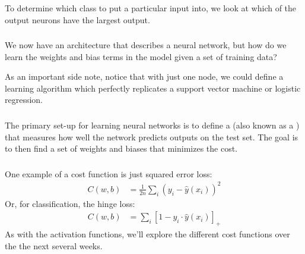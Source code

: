 \documentclass[xetex,mathserif,serif,aspectratio=169]{beamer}
\begin{document}
\begin{frame}[fragile] \frametitle{} \oldB \small


To determine which class to put a particular input into, we
look at which of the output neurons have the largest output.

\end{frame}

\begin{frame}[fragile] \frametitle{} \oldB \small


We now have an architecture that describes a neural network, but
how do we learn the weights and bias terms in the model given a
set of training data?

As an important side note, notice that with just one node, we could
define a learning algorithm which perfectly replicates a support
vector machine or logistic regression.

\end{frame}

\begin{frame}[fragile] \frametitle{} \oldB \small


The primary set-up for learning neural networks is to define a  (also known as a ) that measures how well
the network predicts outputs on the test set. The goal is to then find
a set of weights and biases that minimizes the cost.

\end{frame}

\begin{frame}[fragile] \frametitle{} \oldB \small


One example of a cost function is just squared error loss:
\begin{align*}
C(w, b) &= \frac{1}{2n} \sum_i (y_i - \widehat{y}(x_i) )^2
\end{align*}
Or, for classification, the hinge loss:
\begin{align*}
C(w, b) &= \sum_i \left[1 - y_i \cdot \widehat{y}(x_i) \right]_{+}
\end{align*}
As with the activation functions, we'll explore the different
cost functions over the the next several weeks.

\end{frame}
\end{document}
